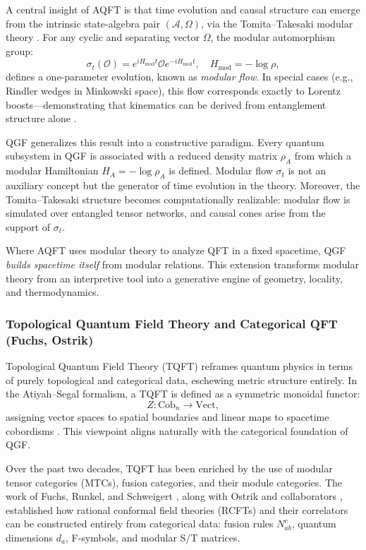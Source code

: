 \documentclass[11pt]{article}
\begin{document}
A central insight of AQFT is that time evolution and causal structure can emerge from the intrinsic state-algebra pair \( (\mathcal{A}, \Omega) \), via the Tomita–Takesaki modular theory \cite{Takesaki1970}. For any cyclic and separating vector \( \Omega \), the modular automorphism group:
\[
\sigma_t(\mathcal{O}) = e^{i H_{\text{mod}} t} \mathcal{O} e^{-i H_{\text{mod}} t}, \quad H_{\text{mod}} = -\log \rho,
\]
defines a one-parameter evolution, known as \emph{modular flow}. In special cases (e.g., Rindler wedges in Minkowski space), this flow corresponds exactly to Lorentz boosts—demonstrating that kinematics can be derived from entanglement structure alone \cite{Bisognano1976}.

QGF generalizes this result into a constructive paradigm. Every quantum subsystem in QGF is associated with a reduced density matrix \( \rho_A \) from which a modular Hamiltonian \( H_A = -\log \rho_A \) is defined. Modular flow \( \sigma_t \) is not an auxiliary concept but the generator of time evolution in the theory. Moreover, the Tomita–Takesaki structure becomes computationally realizable: modular flow is simulated over entangled tensor networks, and causal cones arise from the support of \( \sigma_t \).

Where AQFT uses modular theory to analyze QFT in a fixed spacetime, QGF \emph{builds spacetime itself} from modular relations. This extension transforms modular theory from an interpretive tool into a generative engine of geometry, locality, and thermodynamics.

\subsubsection{Topological Quantum Field Theory and Categorical QFT (Fuchs, Ostrik)}

Topological Quantum Field Theory (TQFT) reframes quantum physics in terms of purely topological and categorical data, eschewing metric structure entirely. In the Atiyah–Segal formalism, a TQFT is defined as a symmetric monoidal functor:
\[
Z: \text{Cob}_n \rightarrow \text{Vect},
\]
assigning vector spaces to spatial boundaries and linear maps to spacetime cobordisms \cite{Atiyah1989}. This viewpoint aligns naturally with the categorical foundation of QGF.

Over the past two decades, TQFT has been enriched by the use of modular tensor categories (MTCs), fusion categories, and their module categories. The work of Fuchs, Runkel, and Schweigert \cite{Fuchs2002}, along with Ostrik and collaborators \cite{Ostrik2002, Etingof2005}, established how rational conformal field theories (RCFTs) and their correlators can be constructed entirely from categorical data: fusion rules \( N_{ab}^c \), quantum dimensions \( d_a \), F-symbols, and modular S/T matrices.
\end{document}

